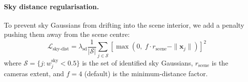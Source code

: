 \paragraph{Sky distance regularisation.}
To prevent sky Gaussians from drifting into the scene interior, we add a penalty pushing them away from the scene centre:
\begin{equation}
    \mathcal{L}_{\text{sky-dist}} = \lambda_{\text{sd}} \frac{1}{|\mathcal{S}|}\sum_{j \in \mathcal{S}} \left[\max(0,\; f \cdot r_{\text{scene}} - \|\mathbf{x}_j\|)\right]^2
    \label{eq:sky_dist}
\end{equation}
where $\mathcal{S} = \{j : w_j^{\text{sky}} < 0.5\}$ is the set of identified sky Gaussians, $r_{\text{scene}}$ is the cameras extent, and $f = 4$ (default) is the minimum-distance factor.